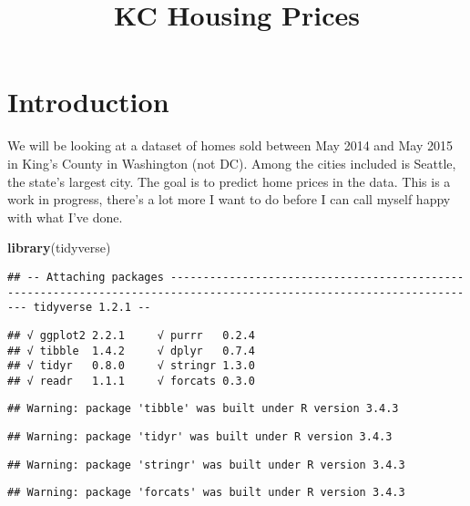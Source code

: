 \documentclass[]{article}
\title{KC Housing Prices}
\author{}
\date{}
\newenvironment{Shaded}{\begin{snugshade}}{\end{snugshade}}
\newcommand{\KeywordTok}[1]{\textcolor[rgb]{0.13,0.29,0.53}{\textbf{#1}}}
\newcommand{\NormalTok}[1]{#1}
\begin{document}
\maketitle

\section{Introduction}\label{introduction}

We will be looking at a dataset of homes sold between May 2014 and May
2015 in King's County in Washington (not DC). Among the cities included
is Seattle, the state's largest city. The goal is to predict home prices
in the data. This is a work in progress, there's a lot more I want to do
before I can call myself happy with what I've done.

\begin{Shaded}
\begin{Highlighting}[]
\KeywordTok{library}\NormalTok{(tidyverse)}
\end{Highlighting}
\end{Shaded}

\begin{verbatim}
## -- Attaching packages ---------------------------------------------------------------------------------------------------------------------- tidyverse 1.2.1 --
\end{verbatim}

\begin{verbatim}
## √ ggplot2 2.2.1     √ purrr   0.2.4
## √ tibble  1.4.2     √ dplyr   0.7.4
## √ tidyr   0.8.0     √ stringr 1.3.0
## √ readr   1.1.1     √ forcats 0.3.0
\end{verbatim}

\begin{verbatim}
## Warning: package 'tibble' was built under R version 3.4.3
\end{verbatim}

\begin{verbatim}
## Warning: package 'tidyr' was built under R version 3.4.3
\end{verbatim}

\begin{verbatim}
## Warning: package 'stringr' was built under R version 3.4.3
\end{verbatim}

\begin{verbatim}
## Warning: package 'forcats' was built under R version 3.4.3
\end{verbatim}
\end{document}
